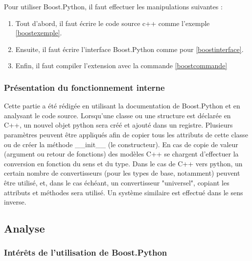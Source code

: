 \documentclass[11pt, french, screen]{report-rd-info}
\begin{document}




Pour utiliser Boost.Python, il faut effectuer les manipulations suivantes :
\begin{enumerate}
\item Tout d'abord, il faut écrire le code source c++ comme l'exemple \ref{boostexemple}.
\item Ensuite, il faut écrire l'interface Boost.Python comme pour \ref{boostinterface}.
\item Enfin, il faut compiler l'extension avec la commande \ref{boostcommande}
\end{enumerate}

\subsubsection{Présentation du fonctionnement interne}

Cette partie a été rédigée en utilisant la documentation de Boost.Python \cite{bpmaindoc} et en analysant le code source.
Lorsqu'une classe ou une structure est déclarée en C++, un nouvel objet python sera créé et ajouté dans un registre. Plusieurs paramètres peuvent être appliqués afin de copier tous les attributs de cette classe ou de créer la méthode \_\_init\_\_ (le constructeur).
En cas de copie de valeur (argument ou retour de fonctions) des modèles C++ se chargent d'effectuer la conversion en fonction du sens et du type. Dans le cas de C++ vers python, un certain nombre de convertisseurs (pour les types de base, notamment) peuvent être utilisé, et, dans le cas échéant, un convertisseur "universel", copiant les attributs et méthodes sera utilisé.
Un système similaire est effectué dans le sens inverse.


\subsection{Analyse}

\subsubsection{Intérêts de l'utilisation de Boost.Python}
\end{document}
